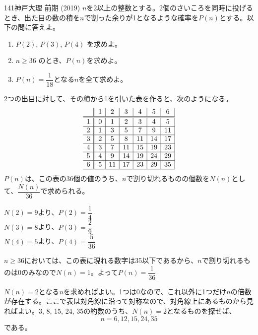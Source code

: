 \begin{thm}{141}{}{神戸大理 前期 (2019)}
 $n$を2以上の整数とする。2個のさいころを同時に投げるとき、出た目の数の積を$n$で割った余りが1となるような確率を$P(n)$とする。以下の問に答えよ。
 \begin{enumerate}
  \item $P(2)$, $P(3)$, $P(4)$ を求めよ。
  \item $n\ge 36$ のとき、$P(n)$を求めよ。
  \item $P(n)=\dfrac{1}{18}$となる$n$を全て求めよ。
 \end{enumerate}
\end{thm}

2つの出目に対して、その積から1を引いた表を作ると、次のようになる。
\begin{align*}
 \begin{array}{c||c|c|c|c|c|c|}
    & 1 & 2 & 3 & 4 & 5 & 6 \\ \hline\hline
  1 & 0 & 1 & 2 & 3 & 4 & 5 \\ \hline
  2 & 1 & 3 & 5 & 7 & 9 & 11\\ \hline
  3 & 2 & 5 & 8 & 11& 14& 17\\ \hline
  4 & 3 & 7 & 11& 15& 19& 23\\ \hline
  5 & 4 & 9 & 14& 19& 24& 29\\ \hline
  6 & 5 & 11& 17& 23& 29& 35\\ \hline
 \end{array}
\end{align*}
$P(n)$は、この表の36個の値のうち、$n$で割り切れるものの個数を$N(n)$として、$\dfrac{N(n)}{36}$で求められる。

$N(2)=9$より、$P(2)=\dfrac{1}{4}$ \\
$N(3)=8$より、$P(3)=\dfrac{2}{9}$ \\
$N(4)=5$より、$P(4)=\dfrac{5}{36}$

$n\ge 36$においては、この表に現れる数字は35以下であるから、$n$で割り切れるものは0のみなので$N(n)=1$。よって$P(n)=\dfrac{1}{36}$

$N(n)=2$となる$n$を求めればよい。1つは0なので、これ以外に1つだけ$n$の倍数が存在する。ここで表は対角線に沿って対称なので、対角線上にあるものから見ればよい。3, 8, 15, 24, 35の約数のうち、$N(n)=2$となるものを探せば、
\[ n=6, 12, 15, 24, 35 \]
である。